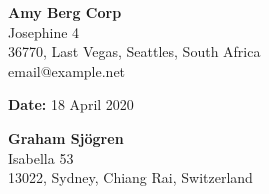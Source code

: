 \documentclass[a4paper]{letter}
\begin{document}
\RaggedRight
%
\begin{minipage}[t]{0.5\textwidth}
	\begin{flushleft}

	\end{flushleft}
\end{minipage}%
\begin{minipage}[t]{0.5\textwidth}
 	\begin{flushright}
		\textbf{\huge  Amy Berg Corp} \\
		{\large Josephine 4}\\
		{\large 36770, Last Vegas, Seattles, South Africa }\\
		{\large email@example.net}
	
 	\end{flushright}
\end{minipage}%

\begin{minipage}[t]{0.5\textwidth}
	\begin{flushleft}

	\end{flushleft}
\end{minipage}%
\begin{minipage}[t]{0.5\textwidth}
 	\begin{flushright}
		\textbf{\large Date:} 18 April 2020\\		
 	\end{flushright}
\end{minipage}%

\begin{minipage}[t]{0.5\textwidth}
	\begin{flushleft}
	 	\textbf{\large Graham Sjögren } \\
		{\large Isabella 53}\\
		{\large 13022, Sydney, Chiang Rai, Switzerland}\\
	\end{flushleft}
\end{minipage}
\begin{minipage}[t]{0.5\textwidth}
 	\begin{flushright} 	
	
 	\end{flushright}
\end{minipage}%
\end{document}
